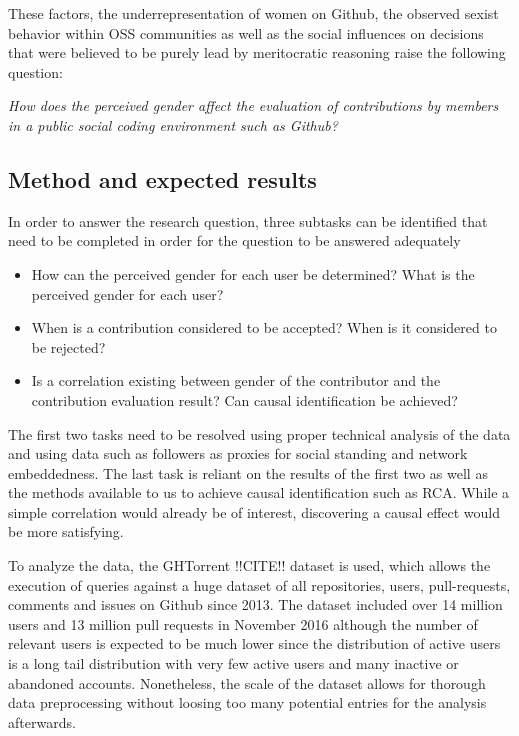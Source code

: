 These factors, the underrepresentation of women on Github, the observed sexist behavior within \ac{OSS} communities as well as the social influences on decisions that were believed to be purely lead by meritocratic reasoning raise the following question:

\emph{How does the perceived gender affect the evaluation of contributions by members in a public social coding environment such as Github?}

\subsection{Method and expected results}

In order to answer the research question, three subtasks can be identified that need to be completed in order for the question to be answered adequately
\begin{itemize}
    \item How can the perceived gender for each user be determined? What is the perceived gender for each user?
    \item When is a contribution considered to be accepted? When is it considered to be rejected?
    \item Is a correlation existing between gender of the contributor and the contribution evaluation result? Can causal identification be achieved?%
\end{itemize}

The first two tasks need to be resolved using proper technical analysis of the data and using data such as followers as proxies for social standing and network embeddedness. The last task is reliant on the results of the first two as well as the methods available to us to achieve causal identification such as \ac{RCA}. While a simple correlation would already be of interest, discovering a causal effect would be more satisfying.

To analyze the data, the GHTorrent !!CITE!! dataset is used, which allows the execution of queries against a huge dataset of all repositories, users, pull-requests, comments and issues on Github since 2013. The dataset included over 14 million users and 13 million pull requests in November 2016 although the number of relevant users is expected to be much lower since the distribution of active users is a long tail distribution with very few active users and many inactive or abandoned accounts. Nonetheless, the scale of the dataset allows for thorough data preprocessing without loosing too many potential entries for the analysis afterwards.

